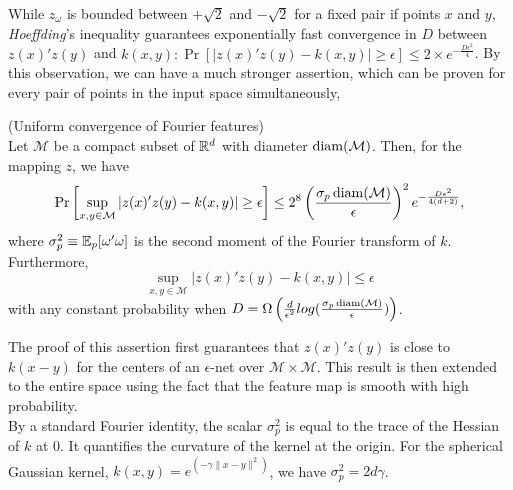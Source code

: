 \documentclass{article}
\begin{document}
While $z_{\omega}$ is bounded between $+ \sqrt{2}$ and $-\sqrt{2}$ for a fixed pair if points $x$ and $y$, \textit{Hoeffding}'s inequality guarantees exponentially fast convergence in $D$ between $z(x)' z(y)$ and $k(x,y): \Pr [|z(x)' z(y) - k(x,y)| \geq \epsilon] \leq 2\times e^{-\frac{D\epsilon^2}{4}}$. By this observation, we can have a much stronger assertion, which can be proven for every pair of points in the input space simultaneously, 

\newpage
\begin{remark}(Uniform convergence of Fourier features)\\
Let $\mathcal{M}$ be a compact subset of $\mathbb{R}^d$ with diameter $\operatorname{diam}(\mathcal{M})$. Then, for the mapping $z$, we have
\begin{equation*}
    \Pr \left[\sup_{x,y \in \mathcal{M}} |z(x)'z(y)-k(x,y)| \geq \epsilon \right] \leq 2^8 \left( \frac{\sigma_p \operatorname{diam}(\mathcal{M})}{\epsilon} \right)^2 e^{-\frac{D\epsilon^2}{4(d+2)}}, 
\end{equation*}
where $\sigma_p^2 \equiv \mathbb{E}_p[\omega' \omega]$ is the second moment of the Fourier transform of $k$.\\
Furthermore, 
\begin{equation*}
    \sup_{x,y \in \mathcal{M}} |z(x)'z(y)-k(x,y)| \leq \epsilon
\end{equation*}
with any constant probability when $D = \Omega\left( \frac{d}{\epsilon^2} log(\frac{\sigma_p \operatorname{diam}(\mathcal{M})}{\epsilon}) \right)$.
\end{remark}

The proof of this assertion first guarantees that $z(x)'z(y)$ is close to $k(x-y)$ for the centers of an $\epsilon$-net over $\mathcal{M} \times \mathcal{M}$. This result is then extended to the entire space using the fact that the feature map is smooth with high probability. \\
By a standard Fourier identity, the scalar $\sigma_p^2$ is equal to the trace of the Hessian of $k$ at 0.  It quantifies the curvature of the kernel at the origin. For the spherical Gaussian kernel, $k(x,y) = e^{(-\gamma \| x-y \| ^2)}$, we have $\sigma_p^2 = 2d\gamma$.
\end{document}
